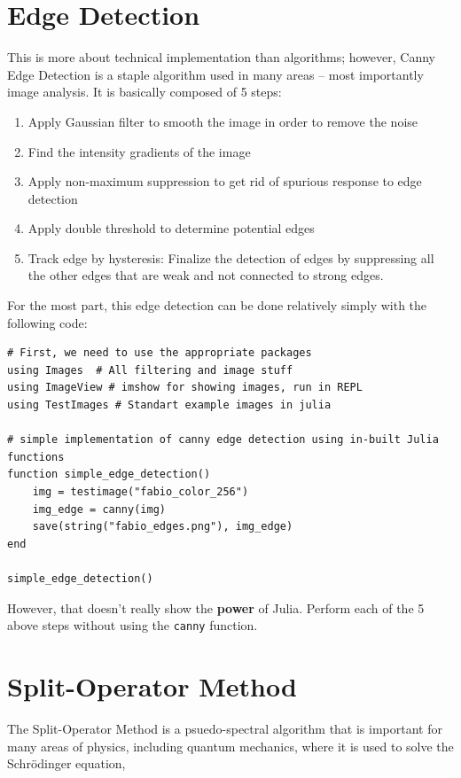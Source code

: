 \documentclass[11pt]{article}
\begin{document}
\section*{Edge Detection}
This is more about technical implementation than algorithms; however, Canny Edge Detection is a staple algorithm used in many areas -- most importantly image analysis. It is basically composed of 5 steps:
\begin{enumerate}
\item Apply Gaussian filter to smooth the image in order to remove the noise
\item Find the intensity gradients of the image
\item Apply non-maximum suppression to get rid of spurious response to edge detection
\item Apply double threshold to determine potential edges
\item Track edge by hysteresis: Finalize the detection of edges by suppressing all the other edges that are weak and not connected to strong edges.
\end{enumerate}

For the most part, this edge detection can be done relatively simply with the following code:

\begin{lstlisting}
# First, we need to use the appropriate packages
using Images  # All filtering and image stuff
using ImageView # imshow for showing images, run in REPL
using TestImages # Standart example images in julia

# simple implementation of canny edge detection using in-built Julia functions
function simple_edge_detection()
    img = testimage("fabio_color_256")
    img_edge = canny(img)
    save(string("fabio_edges.png"), img_edge)
end

simple_edge_detection()

\end{lstlisting}

However, that doesn't really show the \textbf{power} of Julia. Perform each of the 5 above steps without using the \texttt{canny} function.


\newpage
\section*{Split-Operator Method}
The Split-Operator Method is a psuedo-spectral algorithm that is important for many areas of physics, including quantum mechanics, where it is used to solve the Schr\"odinger equation,
\end{document}
